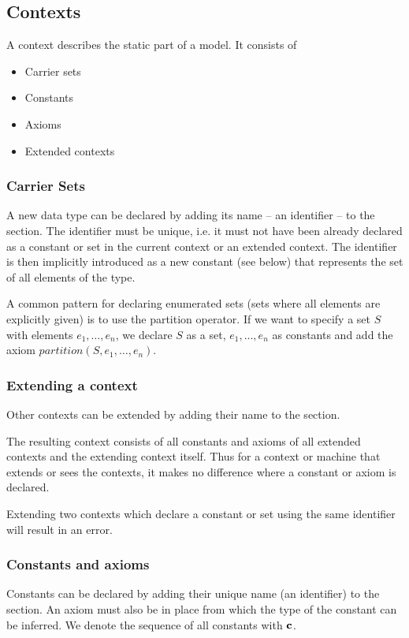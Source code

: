 \subsection{Contexts}
\label{context}

A context describes the static part of a model. It consists of
\begin{itemize}
\item Carrier sets
\item Constants
\item Axioms
\item Extended contexts
\end{itemize}

\subsubsection{Carrier Sets}
\label{carrier_sets}
A new data type can be declared by adding its name -- an identifier -- to the  section.
The identifier must be unique, i.e. it must not have been already declared as a constant or set in the current context or an extended context.
The identifier is then implicitly introduced as a new constant (see below) that represents the set of all elements of the type. 

A common pattern for declaring enumerated sets (sets where all elements are explicitly given)
is to use the partition operator. If we want to specify a set $S$ with elements $e_1,\ldots,e_n$,
we declare $S$ as a set, $e_1,\ldots,e_n$ as constants and add the axiom $partition(S,e_1,\ldots,e_n)$.

\subsubsection{Extending a context}
\label{extendind_a_context}
Other contexts can be extended by adding their name to the  section.

The resulting context consists of all constants and axioms of all extended contexts and the extending context itself.
Thus for a context or machine that extends or sees the contexts, it makes no difference where a constant or axiom is declared.

Extending two contexts which declare a constant or set using the same identifier will result in an error.

\subsubsection{Constants and axioms}
\label{constants_and_axioms}
Constants can be declared by adding their unique name (an identifier) to the  section.
An axiom must also be in place from which the type of the constant can be inferred.
We denote the sequence of all constants with $\mathbf{c}$.

